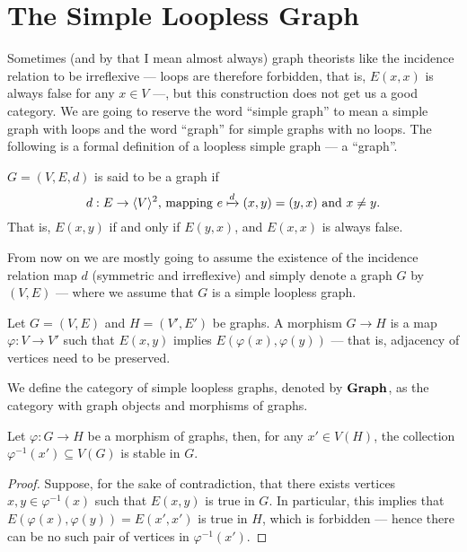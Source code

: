 \section{The Simple Loopless Graph}

Sometimes (and by that I mean almost always) graph theorists like the incidence
relation to be irreflexive --- loops are therefore forbidden, that is, \(E(x, x)\)
is always false for any \(x \in V\) ---, but this construction does not get us a
good category. We are going to reserve the word ``simple graph'' to mean a simple
graph with loops and the word ``graph'' for simple graphs with no loops. The
following is a formal definition of a loopless simple graph --- a ``graph''.

\begin{definition}[Graph]\label{def: graph}
\(G = (V, E, d)\) is said to be a graph if
\[
  d: E \to \langle V \rangle^2 \text{, mapping } e \xmapsto d (x, y) = (y, x)
  \text{ and } x \neq y.
\]
That is, \(E(x, y)\) if and only if \(E(y, x)\), and \(E(x, x)\) is always
false.
\end{definition}

From now on we are mostly going to assume the existence of the incidence
relation map \(d\) (symmetric and irreflexive) and simply denote a graph \(G\)
by \((V, E)\) --- where we assume that \(G\) is a simple loopless graph.

\begin{definition}\label{def: graph-morph}
Let \(G = (V, E)\) and \(H = (V', E')\) be graphs. A morphism \(G \to H\) is a
map \(\varphi: V \to V'\) such that \(E(x, y)\) implies \(E(\varphi(x),
\varphi(y))\) --- that is, adjacency of vertices need to be preserved.
\end{definition}

\begin{definition}\label{def: graph-cat}
We define the category of simple loopless graphs, denoted by \({\textbf{Graph}}\), as
the category with graph objects and morphisms of graphs.
\end{definition}

\begin{lemma}\label{lem: stable-preimage}
Let \(\varphi: G \to H\) be a morphism of graphs, then, for any \(x' \in
V(H)\), the collection \(\varphi^{-1}(x') \subseteq V(G)\) is stable in \(G\).
\end{lemma}

\begin{proof}
Suppose, for the sake of contradiction, that there exists vertices \(x, y \in
\varphi^{-1}(x)\) such that \(E(x, y)\) is true in \(G\). In particular, this
implies that \(E(\varphi(x), \varphi(y)) = E(x', x')\) is true in \(H\), which
is forbidden --- hence there can be no such pair of vertices in
\(\varphi^{-1}(x')\).
\end{proof}

